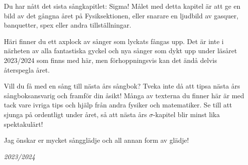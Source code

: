 \documentclass[a6paper, 10pt, twoside]{article}
\begin{document}
\noindent
{}
\small
\vspace{10pt}

\noindent
\small
Du har nått det sista sångkapitlet: Sigma! Målet med detta kapitel är att ge en bild av det gångna året på Fysiksektionen, eller snarare en ljudbild av gasquer, banquetter, spex eller andra tillställningar.  

Häri finner du ett axplock av sånger som lyckats fångas upp. Det är inte i närheten av alla fantastiska gyckel och nya sånger som dykt upp under läsåret 2023/2024 som finns med här, men förhoppningsvis kan det ändå delvis återspegla året. 

Vill du få med en sång till nästa års sångbok? Tveka inte då att tipsa nästa års sångboksansvarig och framför din åsikt! Många av texterna du finner här är med tack vare ivriga tips och hjälp från andra fysiker och matematiker. Se till att sjunga på ordentligt under året, så att nästa års $\sigma$-kapitel blir minst lika spektakulärt!

Jag önskar er mycket sångglädje och all annan form av glädje!


\begin{center}
\huge{\textit{2023/2024}}
\end{center}
\end{document}
